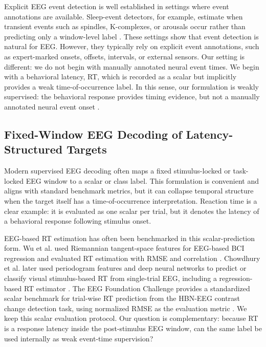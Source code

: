 Explicit EEG event detection is well established in settings where event annotations are available. Sleep-event detectors, for example, estimate when transient events such as spindles, K-complexes, or arousals occur rather than predicting only a window-level label \citep{Chambon2019DOSED}. These settings show that event detection is natural for EEG. However, they typically rely on explicit event annotations, such as expert-marked onsets, offsets, intervals, or external sensors. Our setting is different: we do not begin with manually annotated neural event times. We begin with a behavioral latency, RT, which is recorded as a scalar but implicitly provides a weak time-of-occurrence label. In this sense, our formulation is weakly supervised: the behavioral response provides timing evidence, but not a manually annotated neural event onset \citep{Zhou2018WeakSupervision}.

\subsection{Fixed-Window EEG Decoding of Latency-Structured Targets}

Modern supervised EEG decoding often maps a fixed stimulus-locked or task-locked EEG window to a scalar or class label. This formulation is convenient and aligns with standard benchmark metrics, but it can collapse temporal structure when the target itself has a time-of-occurrence interpretation. Reaction time is a clear example: it is evaluated as one scalar per trial, but it denotes the latency of a behavioral response following stimulus onset.

EEG-based RT estimation has often been benchmarked in this scalar-prediction form. Wu et al. used Riemannian tangent-space features for EEG-based BCI regression and evaluated RT estimation with RMSE and correlation \citep{Wu2017ReactionTimeRiemannian}. Chowdhury et al. later used periodogram features and deep neural networks to predict or classify visual stimulus-based RT from single-trial EEG, including a regression-based RT estimator \citep{Chowdhury2020DNNReactionTime}. The EEG Foundation Challenge provides a standardized scalar benchmark for trial-wise RT prediction from the HBN-EEG contrast change detection task, using normalized RMSE as the evaluation metric \citep{Aristimunha2025,EEGChallenge2025}. We keep this scalar evaluation protocol. Our question is complementary: because RT is a response latency inside the post-stimulus EEG window, can the same label be used internally as weak event-time supervision?

